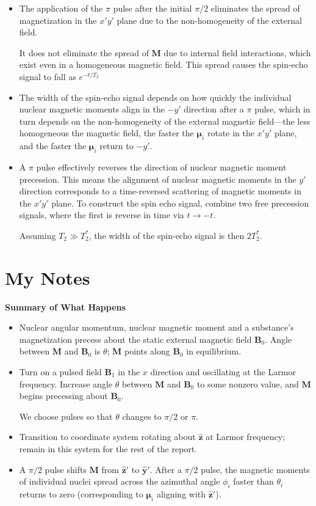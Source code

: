 \documentclass[11pt, a4paper]{article}
\renewcommand{\vec}[1]{\bm{#1}}
\newcommand{\uvec}[1]{\hat{\bm{#1}}}
\newcommand{\m}{\vec{\mu}}  %
\newcommand{\B}{\vec{B}}  %
\newcommand{\M}{\vec{M}}  %
\begin{document}
\begin{itemize}
	
	\item The application of the $ \pi $ pulse after the initial $ \pi/2 $ eliminates the spread of magnetization in the $ x'y' $ plane due to the non-homogeneity of the external field.
	
	It does not eliminate the spread of $ \M $ due to internal field interactions, which exist even in a homogeneous magnetic field. This spread causes the spin-echo signal to fall as $ e^{-t/T_{2}} $
	
	\item The width of the spin-echo signal depends on how quickly the individual nuclear magnetic moments align in the $ -y' $ direction after a $ \pi $ pulse, which in turn depends on the non-homogeneity of the external magnetic field---the less homogeneous the magnetic field, the faster the $ \m_{i} $ rotate in the $ x'y' $ plane, and the faster the $ \m_{i} $ return to $ -y' $.
	
	\item A $ \pi $ pulse effectively reverses the direction of nuclear magnetic moment precession. This means the alignment of nuclear magnetic moments in the $ y' $ direction corresponds to a time-reversed scattering of magnetic moments in the $ x'y' $ plane. To construct the spin echo signal, combine two free precession signals, where the first is reverse in time via $ t \to -t $. 
	
	Assuming $ T_{2} \gg T_{2}^{*} $, the width of the spin-echo signal is then $ 2T_{2}^{*} $.
	
\end{itemize}

\section{My Notes}
\textbf{Summary of What Happens}
\begin{itemize}

	\item Nuclear angular momentum, nuclear magnetic moment and a substance's magnetization precess about the static external magnetic field $ \B_{0} $. Angle between $ \M $ and $ \B_{0} $ is $ \theta $; $ \M $ points along $ \B_{0} $ in equilibrium.
	
	\item Turn on a pulsed field $ \B_{1} $ in the $ x $ direction and oscillating at the Larmor frequency. Increase angle $ \theta $ between $ \M $ and $ \B_{0} $ to some nonzero value, and $ \M $ begins precessing about $ \B_{0} $. 
	
	We choose pulses so that $ \theta $ changes to $ \pi/2 $ or $ \pi $. 
	
	\item Transition to coordinate system rotating about $ \uvec{z} $ at Larmor frequency; remain in this system for the rest of the report.
	
	\item A $ \pi/2 $ pulse shifts $ \M $ from $ \uvec{z}' $ to $ \uvec{y}' $. After a $ \pi/2 $ pulse, the magnetic moments of individual nuclei spread across the azimuthal angle $ \phi_{i} $ faster than $ \theta_{i} $ returns to zero (corresponding to $ \m_{i} $ aligning with $ \uvec{z}' $). 
\end{itemize}
\end{document}
